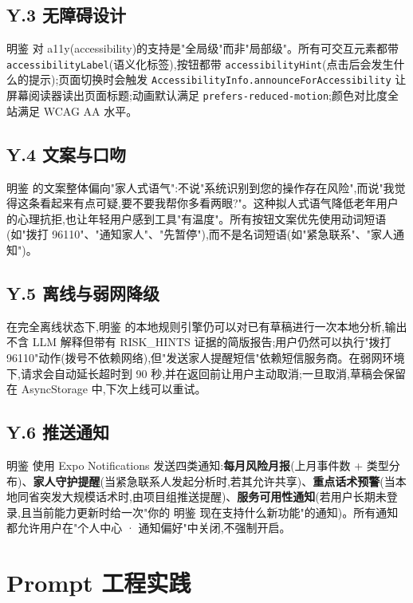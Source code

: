 \documentclass[UTF8,a4paper,12pt]{ctexart}
\begin{document}
\subsection*{Y.3 无障碍设计}

明鉴 对 a11y(accessibility)的支持是"全局级"而非"局部级"。所有可交互元素都带 \texttt{accessibilityLabel}(语义化标签),按钮都带 \texttt{accessibilityHint}(点击后会发生什么的提示);页面切换时会触发 \texttt{AccessibilityInfo.announceForAccessibility} 让屏幕阅读器读出页面标题;动画默认满足 \texttt{prefers-reduced-motion};颜色对比度全站满足 WCAG AA 水平。

\subsection*{Y.4 文案与口吻}

明鉴 的文案整体偏向"家人式语气":不说"系统识别到您的操作存在风险",而说"我觉得这条看起来有点可疑,要不要我帮你多看两眼?"。这种拟人式语气降低老年用户的心理抗拒,也让年轻用户感到工具"有温度"。所有按钮文案优先使用动词短语(如"拨打 96110"、"通知家人"、"先暂停"),而不是名词短语(如"紧急联系"、"家人通知")。

\subsection*{Y.5 离线与弱网降级}

在完全离线状态下,明鉴 的本地规则引擎仍可以对已有草稿进行一次本地分析,输出不含 LLM 解释但带有 RISK\_HINTS 证据的简版报告;用户仍然可以执行"拨打 96110"动作(拨号不依赖网络),但"发送家人提醒短信"依赖短信服务商。在弱网环境下,请求会自动延长超时到 90 秒,并在返回前让用户主动取消;一旦取消,草稿会保留在 AsyncStorage 中,下次上线可以重试。

\subsection*{Y.6 推送通知}

明鉴 使用 Expo Notifications 发送四类通知:\textbf{每月风险月报}(上月事件数 + 类型分布)、\textbf{家人守护提醒}(当紧急联系人发起分析时,若其允许共享)、\textbf{重点话术预警}(当本地同省突发大规模话术时,由项目组推送提醒)、\textbf{服务可用性通知}(若用户长期未登录,且当前能力更新时给一次"你的 明鉴 现在支持什么新功能"的通知)。所有通知都允许用户在"个人中心 · 通知偏好"中关闭,不强制开启。

\section{Prompt 工程实践}
\end{document}
